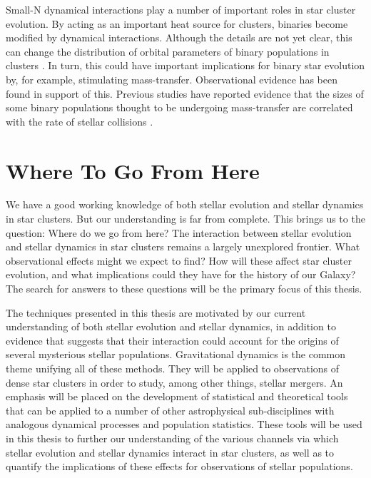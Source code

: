 Small-N dynamical interactions play a number of important roles in
star cluster evolution.  By acting as an important heat
source for clusters, binaries become modified by dynamical
interactions.  Although the details are not yet clear, this can change
the distribution of orbital parameters of binary populations in
clusters \citep[e.g.][]{hut83b, sigurdsson93}.  In turn, this could have important implications for
binary star evolution by, for example, stimulating mass-transfer.
Observational evidence has been found in support of this.  Previous
studies have reported evidence that the sizes of some binary 
populations thought to be undergoing mass-transfer are correlated with
the rate of stellar collisions \citep[e.g.][]{pooley06}.

\section{Where To Go From Here} \label{wheretogo}

We have a good working knowledge of both stellar evolution and stellar
dynamics in star clusters.  But our understanding is far from
complete.  This brings us to the question:  Where
do we go from here?  The interaction between stellar evolution
and stellar dynamics in star clusters remains a largely unexplored
frontier.  What observational effects might 
we expect to find?  How will these affect star cluster evolution, and
what implications could they have for the history of our Galaxy?
The search for answers to these questions will be the primary focus of
this thesis.  

The techniques presented in this thesis are motivated by our current
understanding of both stellar evolution and stellar dynamics, in
addition to evidence that suggests that their interaction could
account for the origins of several mysterious stellar populations.
Gravitational dynamics is the common theme unifying all of these
methods.  They will be applied to 
observations of dense star clusters in order to study, among other
things, stellar mergers.  An emphasis will be placed on the development of
statistical and theoretical tools that can be applied to a number of
other astrophysical sub-disciplines with analogous dynamical
processes and population statistics.  These tools will be used in this
thesis to further our understanding of 
the various channels via which stellar evolution and stellar dynamics
interact in star clusters, as well as to quantify
the implications of these effects for observations of stellar
populations.  

